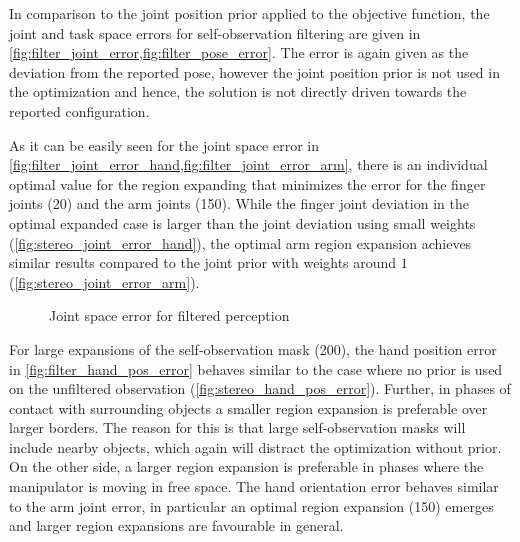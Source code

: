 In comparison to the joint position prior applied to the objective function, the joint and task space errors for self-observation filtering are given in \cref{fig:filter_joint_error,fig:filter_pose_error}. The error is again given as the deviation from the reported pose, however the joint position prior is not used in the optimization and hence, the solution is not directly driven towards the reported configuration.

As it can be easily seen for the joint space error in \cref{fig:filter_joint_error_hand,fig:filter_joint_error_arm}, there is an individual optimal value for the region expanding that minimizes the error for the finger joints (20) and the arm joints (150). While the finger joint deviation in the optimal expanded case is larger than the joint deviation using small weights (\cref{fig:stereo_joint_error_hand}), the optimal arm region expansion achieves similar results compared to the joint prior with weights around $1$ (\cref{fig:stereo_joint_error_arm}).

\begin{figure}[h]
\centering
{}
\caption{Joint space error for filtered perception}
\label{fig:filter_joint_error}
\end{figure}

For large expansions of the self-observation mask (200), the hand position error in \cref{fig:filter_hand_pos_error} behaves similar to the case where no prior is used on the unfiltered observation (\cref{fig:stereo_hand_pos_error}). Further, in phases of contact with surrounding objects a smaller region expansion is preferable over larger borders. The reason for this is that large self-observation masks will include nearby objects, which again will distract the optimization without prior. On the other side, a larger region expansion is preferable in phases where the manipulator is moving in free space.
The hand orientation error behaves similar to the arm joint error, in particular an optimal region expansion (150) emerges and larger region expansions are favourable in general.

